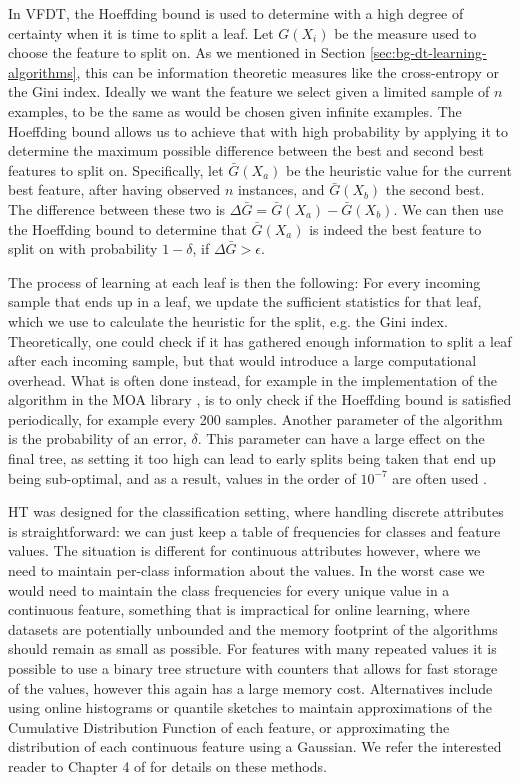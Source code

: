 In VFDT, the Hoeffding bound is used to determine with a high degree of certainty when
it is time to split a leaf. Let $G(X_i)$ be the measure used to choose the feature
to split on. As we mentioned in Section \ref{sec:bg-dt-learning-algorithms}, this can be
information theoretic measures like the cross-entropy or the Gini index. Ideally we want the feature we select given a limited sample of $n$ examples, to be the same as would be chosen given infinite examples.
The Hoeffding bound allows us to achieve that with high probability by applying
it to determine the maximum possible difference between the best and second best
features to split on. Specifically, let $\bar{G}(X_a)$ be the heuristic value for the
current best feature, after having observed $n$ instances, and $\bar{G}(X_b)$ the second
best. The difference between these two is $\Delta \bar{G} = \bar{G}(X_a) - \bar{G}(X_b)$.
We can then use the Hoeffding bound to determine that $\bar{G}(X_a)$ is indeed the
best feature to split on with probability $1-\delta$, if $\Delta \bar{G} > \epsilon$.

The process of learning at each leaf is then the following: For every incoming sample
that ends up in a leaf, we update the sufficient statistics for that leaf, which we
use to calculate the heuristic for the split, e.g. the Gini index. Theoretically,
one could check if it has gathered enough information to split a leaf after each
incoming sample, but that would introduce a large computational overhead. What is often done
instead, for example in the implementation of the algorithm in the MOA library \cite{bifet2010moa},
is to only check if the Hoeffding bound is satisfied periodically, for example
every 200 samples. Another parameter of the algorithm is the probability of an error,
$\delta$. This parameter can have a large effect on the final tree, as setting it
too high can lead to early splits being taken that end up being sub-optimal, and as a result,
values in the order of $10^{-7}$ are often used \cite{data-stream-mining}.

HT was designed for the classification setting, where handling discrete attributes
is straightforward: we can just keep a table of frequencies for classes and feature
values. The situation
is different for continuous attributes however, where we need to maintain per-class
information about the values. In the worst case we would need to maintain the class
frequencies for every unique value in a continuous feature, something that is impractical
for online learning, where datasets are potentially unbounded and the memory footprint
of the algorithms should remain as small as possible. For features with many repeated
values it is possible to use a binary tree structure with counters that allows for
fast storage of the values, however this again has a large memory cost. Alternatives include
using online histograms or quantile sketches \cite{greenwald2016quantiles}
to maintain approximations of the Cumulative Distribution Function of
each feature, or approximating the distribution of each continuous feature using a Gaussian.
We refer the interested reader to Chapter 4 of \citet{data-stream-mining} for details on these methods.


